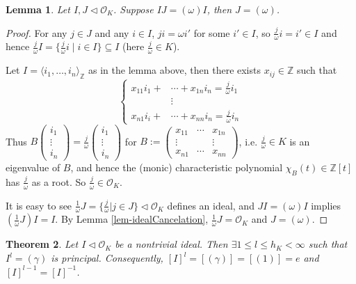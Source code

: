 \documentclass[11pt]{book}
\newtheorem{theorem}{Theorem}[section]
\newtheorem{lemma}[theorem]{Lemma}
\begin{document}
\begin{lemma}\label{lem-idealCancelationPrincipal}
    Let $I,J\lhd \mathcal{O}_{K}$. Suppose $IJ=(\omega)I$, then $J=(\omega)$. 
\end{lemma}

\begin{proof}
    For any $j\in J$ and any $i\in I$, $ji=\omega i'$ for some $i'\in I$, so $\frac{j}{\omega}i=i'\in I$ and hence $\frac{j}{\omega}I = \{\frac{j}{\omega} i \mid i \in I\} \subseteq I$ (here $\frac{j}{\omega}\in K$). 
    
    Let $I=\langle i_{1},\dots, i_{n}\rangle_{\mathbb{Z}}$ as in the lemma above, then there exists $x_{ij} \in \mathbb{Z}$ such that
    \[
    \left\{
        \begin{aligned}
            x_{11}i_{1}+&\cdots+x_{1n}i_{n}=\frac{j}{\omega}i_{1}\\
            &\vdots\\
            x_{n1}i_{i}+&\cdots+x_{nn}i_{n}=\frac{j}{\omega}i_{n}
        \end{aligned}
    \right.
    \]
    Thus $B\begin{pmatrix}
        i_{1}\\\vdots\\i_{n}
    \end{pmatrix}=\frac{j}{\omega}\begin{pmatrix}
        i_{1}\\\vdots\\i_{n}
    \end{pmatrix}$ for $B:=\begin{pmatrix}
        x_{11}&\cdots &x_{1n}\\
        \vdots&&\vdots\\
        x_{n1}&\cdots &x_{nn}
    \end{pmatrix}
    $, i.e. $\frac{j}{\omega} \in K$ is an eigenvalue of $B$, and hence the (monic) characteristic polynomial $\chi_{B}(t)\in \mathbb{Z}[t]$ has $\frac{j}{\omega}$ as a root. So $\frac{j}{\omega}\in \mathcal{O}_{K}$. 

    \medskip
    It is easy to see $\frac{1}{\omega}J=\{\frac{j}{\omega}|j\in J\}\lhd \mathcal{O}_{K}$ defines an ideal, and 
    $JI=(\omega)I$ implies $(\frac{1}{\omega}J)I=I$. By Lemma \ref{lem-idealCancelation}, $\frac{1}{\omega}J=\mathcal{O}_{K}$ and $J=(\omega)$. 
\end{proof}

\begin{theorem}\label{thm-idealClassFiniteOrder}
    Let $I\lhd \mathcal{O}_{K}$ be a nontrivial ideal. Then $\exists 1\leq l\leq h_{K}<\infty$ such that $I^{l}=(\gamma)$ is principal. Consequently, $[I]^{l}=[(\gamma)]=[(1)]=e$ and $[I]^{l-1}=[I]^{-1}$. 
\end{theorem}
\end{document}
